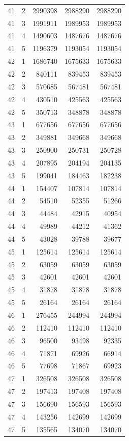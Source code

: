 \begin{longtable}{rrrrr}
41 & 2 & 2990398 & 2988290 & 2988290 \\
41 & 3 & 1991911 & 1989953 & 1989953 \\
41 & 4 & 1490603 & 1487676 & 1487676 \\
41 & 5 & 1196379 & 1193054 & 1193054 \\
42 & 1 & 1686740 & 1675633 & 1675633 \\
42 & 2 & 840111 & 839453 & 839453 \\
42 & 3 & 570685 & 567481 & 567481 \\
42 & 4 & 430510 & 425563 & 425563 \\
42 & 5 & 350713 & 348878 & 348878 \\
43 & 1 & 677656 & 677656 & 677656 \\
43 & 2 & 349881 & 349668 & 349668 \\
43 & 3 & 250900 & 250731 & 250728 \\
43 & 4 & 207895 & 204194 & 204135 \\
43 & 5 & 199041 & 184463 & 182238 \\
44 & 1 & 154407 & 107814 & 107814 \\
44 & 2 & 54510 & 52355 & 51266 \\
44 & 3 & 44484 & 42915 & 40954 \\
44 & 4 & 49989 & 44212 & 41362 \\
44 & 5 & 43028 & 39788 & 39677 \\
45 & 1 & 125614 & 125614 & 125614 \\
45 & 2 & 63059 & 63059 & 63059 \\
45 & 3 & 42601 & 42601 & 42601 \\
45 & 4 & 31878 & 31878 & 31878 \\
45 & 5 & 26164 & 26164 & 26164 \\
46 & 1 & 276455 & 244994 & 244994 \\
46 & 2 & 112410 & 112410 & 112410 \\
46 & 3 & 96500 & 93498 & 92335 \\
46 & 4 & 71871 & 69926 & 66914 \\
46 & 5 & 77698 & 71867 & 69923 \\
47 & 1 & 326508 & 326508 & 326508 \\
47 & 2 & 197413 & 197408 & 197408 \\
47 & 3 & 156690 & 156593 & 156593 \\
47 & 4 & 143256 & 142699 & 142699 \\
47 & 5 & 135565 & 134070 & 134070 \\

\end{longtable}
